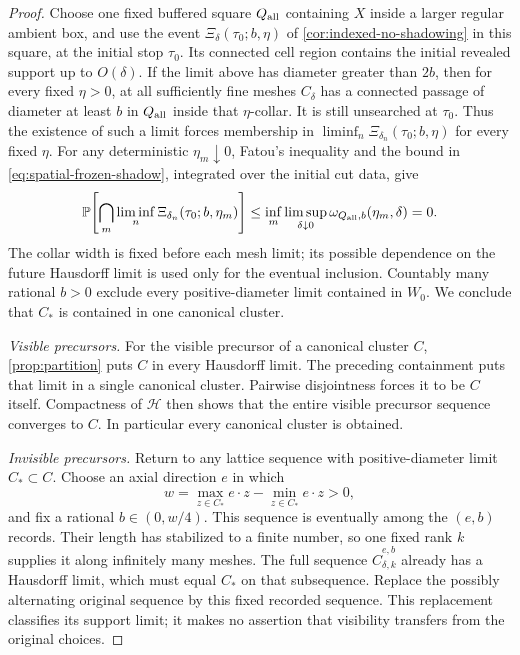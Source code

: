 \begin{proof}
Choose one fixed buffered square \(Q_{\rm all}\) containing \(X\)
inside a larger regular ambient box,
and use the event \(\Xi_\delta(\tau_0;b,\eta)\) of
\cref{cor:indexed-no-shadowing} in this square, at the initial stop
\(\tau_0\). Its connected cell region contains the initial revealed
support up to \(O(\delta)\). If the limit above has diameter greater
than \(2b\), then for every fixed \(\eta>0\), at all sufficiently fine
meshes \(C_\delta\) has a connected passage of diameter at least \(b\)
in \(Q_{\rm all}\) inside that \(\eta\)-collar. It is still unsearched
at \(\tau_0\). Thus the existence of such a limit forces membership in
\(\liminf_n\Xi_{\delta_n}(\tau_0;b,\eta)\) for every fixed \(\eta\).
For any deterministic \(\eta_m\downarrow0\), Fatou's inequality and
the bound in \cref{eq:spatial-frozen-shadow}, integrated over the
initial cut data, give
\[
 \P\!\left[\bigcap_m\liminf_n
       \Xi_{\delta_n}(\tau_0;b,\eta_m)\right]
 \leq \inf_m\limsup_{\delta\downarrow0}
       \omega_{Q_{\rm all},b}(\eta_m,\delta)=0.
\]
The collar width is fixed before each mesh limit; its possible
dependence on the future Hausdorff limit is used only for the
eventual inclusion. Countably many rational \(b>0\) exclude every
positive-diameter limit contained in \(W_0\). We conclude that
\(C_*\) is contained in one canonical cluster.

\emph{Visible precursors.}
For the visible precursor of a canonical cluster \(C\),
\cref{prop:partition} puts \(C\) in every Hausdorff limit.
The preceding containment puts that limit in a single canonical
cluster. Pairwise disjointness forces it to be \(C\) itself.
Compactness of \(\mathscr H\) then shows that the entire visible
precursor sequence converges to \(C\). In particular every canonical
cluster is obtained.

\emph{Invisible precursors.}
Return to any lattice sequence with positive-diameter limit
\(C_*\subset C\). Choose an axial direction \(e\) in which
\[
 w=\max_{z\in C_*}e\cdot z-\min_{z\in C_*}e\cdot z>0,
\]
and fix a rational \(b\in(0,w/4)\). This sequence is eventually among
the \((e,b)\) records. Their length has stabilized to a finite number,
so one fixed rank \(k\) supplies it along infinitely many meshes.
The full sequence \(\widehat C_{\delta,k}^{e,b}\) already has a
Hausdorff limit, which must equal \(C_*\) on that subsequence. Replace
the possibly alternating original sequence by this fixed recorded
sequence. This replacement classifies its support limit; it makes no
assertion that visibility transfers from the original choices.


\end{proof}
